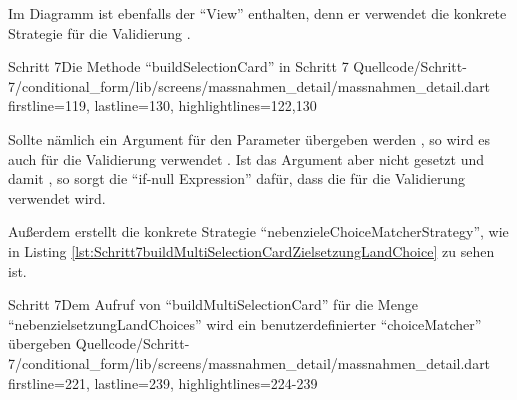 Im Diagramm ist ebenfalls der \enquote{View}  enthalten,
denn er verwendet die konkrete Strategie  für die Validierung \Lst{\ref{lst:Schritt7buildSelectionCard}}.

\begin{alexlisting}{Schritt 7}{Die Methode \enquote{buildSelectionCard} in Schritt 7}
  {Quellcode/Schritt-7/conditional_form/lib/screens/massnahmen_detail/massnahmen_detail.dart}
  {firstline=119, lastline=130, highlightlines={122,130}}
  \label{lst:Schritt7buildSelectionCard}
\end{alexlisting}

Sollte nämlich ein Argument für den Parameter  übergeben werden ,
so wird es auch für die Validierung verwendet .
Ist das Argument aber nicht gesetzt und damit ,
so sorgt die \enquote{if-null Expression} dafür,
dass die  für die Validierung verwendet wird.

Außerdem erstellt  die konkrete Strategie \enquote{nebenzieleChoiceMatcherStrategy}, wie in Listing \ref{lst:Schritt7buildMultiSelectionCardZielsetzungLandChoice} zu sehen ist.

\begin{alexlisting}{Schritt 7}{Dem Aufruf von \enquote{buildMultiSelectionCard} für die Menge \enquote{nebenzielsetzungLandChoices} wird ein benutzerdefinierter \enquote{choiceMatcher} übergeben}
  {Quellcode/Schritt-7/conditional_form/lib/screens/massnahmen_detail/massnahmen_detail.dart}
  {firstline=221, lastline=239, highlightlines={224-239}}
  \label{lst:Schritt7buildMultiSelectionCardZielsetzungLandChoice}
\end{alexlisting}

